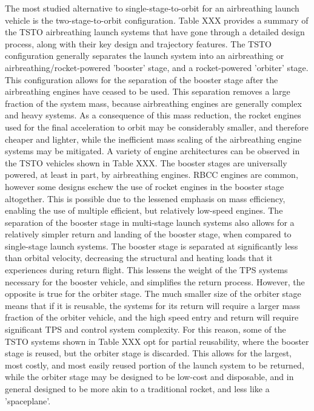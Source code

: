 The most studied alternative to single-stage-to-orbit for an airbreathing launch vehicle is the two-stage-to-orbit configuration. Table XXX provides a summary of the TSTO airbreathing launch systems that have gone through a detailed design process, along with their key design and trajectory features. The TSTO configuration generally separates the launch system into an airbreathing or airbreathing/rocket-powered 'booster' stage, and a rocket-powered 'orbiter' stage. This configuration allows for the separation of the booster stage after the airbreathing engines have ceased to be used. This separation removes a large fraction of the system mass, because airbreathing engines are generally complex and heavy systems. As a consequence of this mass reduction, the rocket engines used for the final acceleration to orbit may be considerably smaller, and therefore cheaper and lighter, while the inefficient mass scaling of the airbreathing engine systems may be mitigated. 
A variety of engine architectures can be observed in the TSTO vehicles shown in Table XXX. The booster stages are universally powered, at least in part, by airbreathing engines. RBCC engines are common, however some designs eschew the use of rocket engines in the booster stage altogether. This is possible due to the lessened emphasis on mass efficiency, enabling the use of multiple efficient, but relatively low-speed engines.
The separation of the booster stage in multi-stage launch systems also allows for a relatively simpler return and landing of the booster stage, when compared to single-stage launch systems. The booster stage is separated at significantly less than orbital velocity, decreasing the structural and heating loads that it experiences during return flight. This lessens the weight of the TPS systems necessary for the booster vehicle, and simplifies the return process.
However, the opposite is true for the orbiter stage. The much smaller size of the orbiter stage means that if it is reusable, the systems for its return will require a larger mass fraction of the orbiter vehicle, and the high speed entry and return will require significant TPS and control system complexity. 
For this reason, some of the TSTO systems shown in Table XXX opt for partial reusability, where the booster stage is reused, but the orbiter stage is discarded. This allows for the largest, most costly, and most easily reused portion of the launch system to be returned, while the orbiter stage may be designed to be low-cost and disposable, and in general designed to be more akin to a traditional rocket, and less like a 'spaceplane'. 


